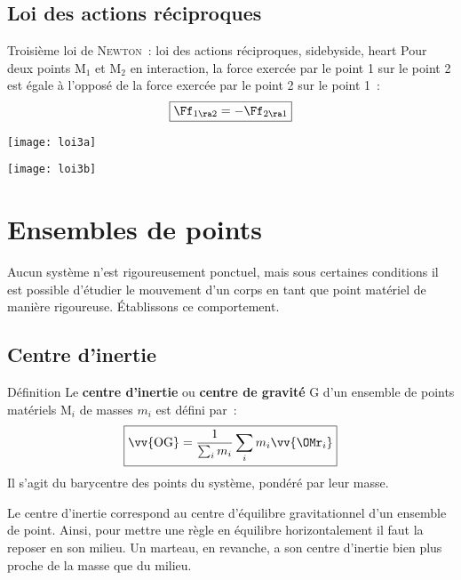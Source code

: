 \documentclass[../main/main.tex]{subfiles}
\begin{document}
\subsection{Loi des actions réciproques}

\begin{tprop}{Troisième loi de \textsc{Newton}~: loi des actions réciproques,
    sidebyside, heart}
    Pour deux points M$_1$ et M$_2$ en interaction, la force exercée par le
    point 1 sur le point 2 est égale à l'opposé de la force exercée par le point
    2 sur le point 1~:
    \[\boxed{\Ff_{1\ra2} = - \Ff_{2\ra1}}\]
    \tcblower
    \begin{minipage}{0.45\linewidth}
        \begin{center}
            \texttt{[image: loi3a]}
        \end{center}
    \end{minipage}
    \hfill
    \begin{minipage}{0.45\linewidth}
        \begin{center}
            \texttt{[image: loi3b]}
        \end{center}
    \end{minipage}
\end{tprop}

\section{Ensembles de points}
Aucun système n'est rigoureusement ponctuel, mais sous certaines conditions il
est possible d'étudier le mouvement d'un corps en tant que point matériel de
manière rigoureuse. Établissons ce comportement.

\subsection{Centre d'inertie}

\begin{tdefi}{Définition}
    Le \textbf{centre d'inertie} ou \textbf{centre de gravité} G d'un ensemble
    de points matériels M$_i$ de masses $m_i$ est défini par~:
    \[\boxed{\vv{\rm OG} = \frac{1}{\sum_i m_i} \sum_i m_i \vv{{\OMr}_i}}\]
    Il s'agit du barycentre des points du système, pondéré par leur masse.
\end{tdefi}

Le centre d'inertie correspond au centre d'équilibre gravitationnel d'un
ensemble de point. Ainsi, pour mettre une règle en équilibre horizontalement il
faut la reposer en son milieu. Un marteau, en revanche, a son centre d'inertie
bien plus proche de la masse que du milieu.
\end{document}

